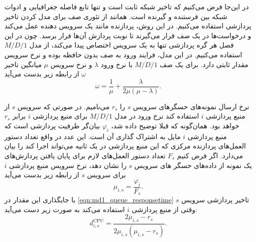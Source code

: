     در این‌جا فرض می‌کنیم که تاخیر شبکه ثابت است و تنها تابع فاصله جغرافیایی و ادوات شبکه بین فرستنده و گیرنده است.
    همانند \cite{optimial_price_cloud_valerio} از تئوری صف برای مدل کردن تاخیر پردازشی استفاده می‌کنیم.
    در این روش، پردازنده مانند یک سرویس دهنده عمل می‌کند و درخواست‌ها در یک صف قرار می‌گیرند تا نوبت پردازش آن‌ها فرار برسد.
    چون در این فصل هر گره پردازشی تنها به یک سرویس اختصاص پیدا می‌کند، از مدل $M/D/1$ استفاده می‌کنیم.
    در این مدل، فرایند ورود به صف بدون حافظه بوده و نرخ سرویس‌ مقدار ثابتی دارد.
    برای یک صف $M/D/1$ با نرخ ورود $\lambda$ و نرخ سرویس  $\mu$ میانگین تاخیر $\omega$ از رابطه زیر بدست می‌آید\cite{basic_queueing_sztrik}
    \begin{equation}\label{eqn:md1_queue_responsetime}
      \omega = \frac{1}{\mu} + \frac{\lambda}{2\mu(\mu-\lambda)}.
    \end{equation}
    
    نرخ ارسال نمونه‌های حسگر‌های سرویس $s$ را $r_s$ می‌نامیم.
    در صورتی که سرویس $s$ از منبع پردازشی $i$ استفاده کند نرخ ورود در مدل $M/D/1$ برای منبع پردازشی $i$ برابر $r_s$ خواهد بود.
    همان‌گونه که قبلا توضیح داده شد، $\varphi_i$ بیان‌گر ظرفیت پردازشی است که منبع پردازشی $i$ مایل به اشتراک گذاری آن است.
    این عدد در واقع تعداد دستور العمل‌های پردازنده مرکزی که این منبع پردازشی در یک ثانیه می‌تواند اجرا کند را بیان می‌دارد.
    اگر فرض کنیم $F_s$ تعداد دستور العمل‌های لازم برای پایان یافتن پردازش‌های یک نمونه از داده‌های حسگر های سرویس‌ $s$ را نشان دهد، نرخ سرویس منبع پردازشی $i$ برای سرویس $s$ از رابطه زیر بدست می‌آید
    \begin{equation}
      \mu_{i,s} = \frac{\varphi_i}{F_s}.
    \end{equation}
    با جایگذاری این مقدار در \cref{eqn:md1_queue_responsetime} تاخیر پردازشی سرویس $s$ وقتی از منبع پردازشی $i$ استفاده می‌کند به صورت زیر دست می‌آید:
    \begin{equation}
      d_{i,s}^{\text{CPU}} = \frac{2\mu_{i,s}-r_s}{2\mu_{i,s}(\mu_{i,s}-r_s)}.
    \end{equation}

